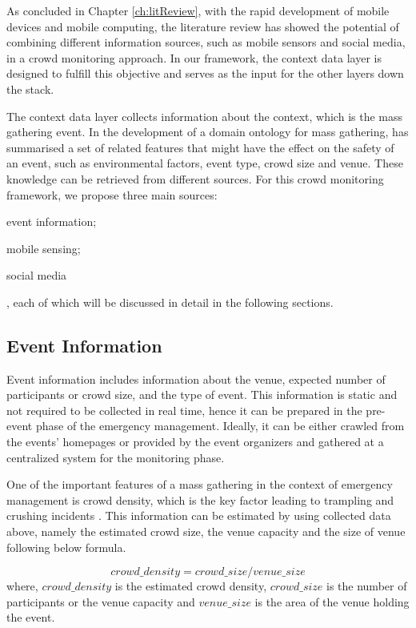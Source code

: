 As concluded in Chapter \ref{ch:litReview}, with the rapid development of mobile devices and mobile computing, the literature review has showed the potential of combining different information sources, such as mobile sensors and social media, in a crowd monitoring approach. In our framework, the context data layer is designed to fulfill this objective and serves as the input for the other layers down the stack.

The context data layer collects information about the context, which is the mass gathering event. In the development of a domain ontology for mass gathering, \citet{DelirHaghighi2013a} has summarised a set of related features that might have the effect on the safety of an event, such as environmental factors, event type, crowd size and venue. These knowledge can be retrieved from different sources. For this crowd monitoring framework, we propose three main sources: 
\begin{inparaenum}[i)]
\item event information;
\item mobile sensing;
\item social media
\end{inparaenum}, each of which will be discussed in detail in the following sections.

\subsection{Event Information}
Event information includes information about the venue, expected number of participants or crowd size, and the type of event. This information is static and not required to be collected in real time, hence it can be prepared in the pre-event phase of the emergency management. Ideally, it can be either crawled from the events' homepages or provided by the event organizers and gathered at a centralized system for the monitoring phase.

One of the important features of a mass gathering in the context of emergency management is crowd density, which is the key factor leading to trampling and crushing incidents \citet{Lee2005}. This information can be estimated by using collected data above, namely the estimated crowd size, the venue capacity and the size of venue following below formula.

\[
crowd\_density = crowd\_size / venue\_size
\]
where, \(crowd\_density\) is the estimated crowd density, \(crowd\_size\) is the number of participants or the venue capacity and \(venue\_size\) is the area of the venue holding the event.

